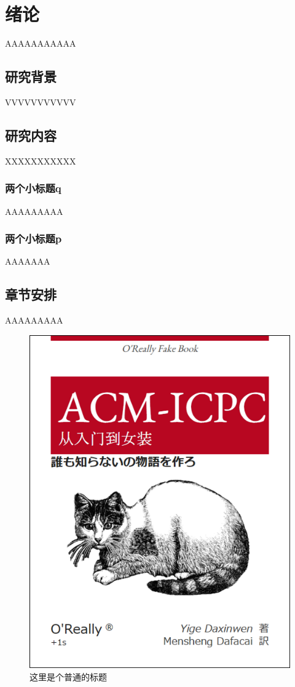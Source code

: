 \chapter{绪论}
AAAAAAAAAAA
\section{研究背景}
VVVVVVVVVVV
\section{研究内容}
XXXXXXXXXXX
\subsection{两个小标题q}
AAAAAAAAA
\subsection{两个小标题p}
AAAAAAA
\section{章节安排}
AAAAAAAAA
\begin{figure}[ht]
	\centering
	\includegraphics[scale=0.6]{figures/figure1.png}
	\caption{
		这里是个普通的标题
	}
	\label{fig:example}
\end{figure}
\endinput